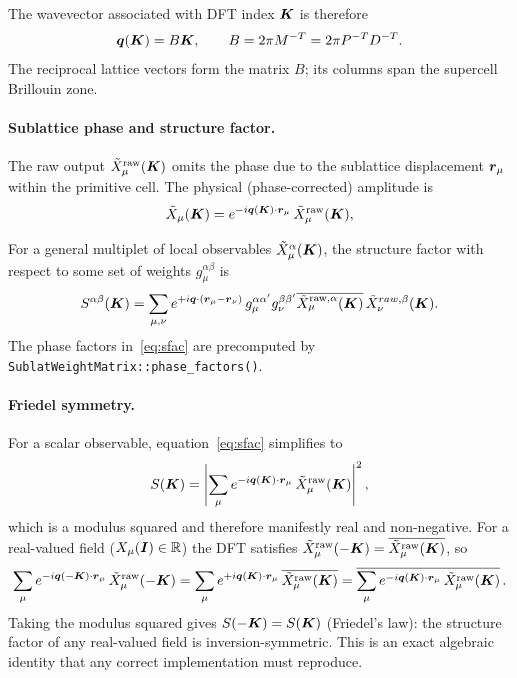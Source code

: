 \documentclass[12pt,a4paper]{article}
\newcommand\bs[1]{\ensuremath\boldsymbol{#1}}
\def\raw{\mathrm{raw}}
\begin{document}
The wavevector associated with DFT index $\bs{K}$ is therefore
\begin{equation}
    \bs{q}(\bs{K}) = B \bs{K}, \qquad B = 2\pi M^{-T} = 2\pi P^{-T} D^{-T}  .
    \label{eq:bvec}
\end{equation}
The reciprocal lattice vectors form the matrix $B$; its columns span the
supercell Brillouin zone.

\paragraph{Sublattice phase and structure factor.}
The raw output $\tilde{X}^{\raw}_\mu(\bs{K})$ omits the phase due to the sublattice
displacement $\bs{r}_\mu$ within the primitive cell.  The physical (phase-corrected) amplitude is
\[
    \tilde{X}_\mu(\bs{K}) = e^{-i\bs{q}(\bs{K})\cdot\bs{r}_\mu}\,\tilde{X}^{\raw}_\mu(\bs{K}),
\]

For a general multiplet of local observables $\tilde{X}^\alpha_\mu(\bs{K})$, the structure factor with respect to some set of weights $g^{\alpha \beta}_\mu$ is
\begin{equation}
    S^{\alpha\beta}(\bs{K}) = \sum_{\mu,\nu} e^{+i\bs{q}\cdot(\bs{r}_\mu - \bs{r}_\nu)}\,
    g_\mu^{\alpha \alpha'} 
    g_\nu^{\beta \beta'}
    \overline{\tilde{X}^{\raw,\alpha}_\mu(\bs{K})}\,\tilde{X}^{raw, \beta}_\nu(\bs{K}).
    \label{eq:sfac}
\end{equation}
The phase factors in~\eqref{eq:sfac} are precomputed by \texttt{SublatWeightMatrix::phase\_factors()}.

\paragraph{Friedel symmetry.}
For a scalar observable, equation~\eqref{eq:sfac} simplifies to
\begin{equation}
    S(\bs{K}) = \left|\sum_\mu e^{-i\bs{q}(\bs{K})\cdot\bs{r}_\mu}\,
                      \tilde{X}^{\raw}_\mu(\bs{K})\right|^2,
    \label{eq:sfac_scalar}
\end{equation}
which is a modulus squared and therefore manifestly real and non-negative.
For a real-valued field ($X_\mu(\bs{I})\in\mathbb{R}$) the DFT satisfies
$\tilde{X}^{\raw}_\mu(-\bs{K}) = \overline{\tilde{X}^{\raw}_\mu(\bs{K})}$,
so
\[
    \sum_\mu e^{-i\bs{q}(-\bs{K})\cdot\bs{r}_\mu}\,\tilde{X}^{\raw}_\mu(-\bs{K})
    = \sum_\mu e^{+i\bs{q}(\bs{K})\cdot\bs{r}_\mu}\,
      \overline{\tilde{X}^{\raw}_\mu(\bs{K})}
    = \overline{\sum_\mu e^{-i\bs{q}(\bs{K})\cdot\bs{r}_\mu}\,
      \tilde{X}^{\raw}_\mu(\bs{K})}\,.
\]
Taking the modulus squared gives $S(-\bs{K}) = S(\bs{K})$ (Friedel's law):
the structure factor of any real-valued field is inversion-symmetric.
This is an exact algebraic identity that any correct implementation must
reproduce.
\end{document}
